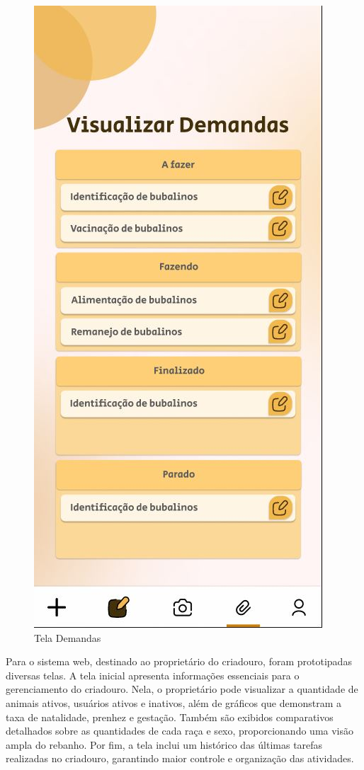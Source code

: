 \newpage
\begin{figure}[!h]
\centering
\caption{Tela Demandas}%
\label{fig:ux-mobile04}
\includegraphics[scale=0.6]{Illustrations/UX-Mobile/Mobi-04.JPG}
\end{figure}

Para o sistema web, destinado ao proprietário do criadouro, foram prototipadas diversas telas. A tela inicial  apresenta informações essenciais para o gerenciamento do criadouro. Nela, o proprietário pode visualizar a quantidade de animais ativos, usuários ativos e inativos, além de gráficos que demonstram a taxa de natalidade, prenhez e gestação. Também são exibidos comparativos detalhados sobre as quantidades de cada raça e sexo, proporcionando uma visão ampla do rebanho. Por fim, a tela inclui um histórico das últimas tarefas realizadas no criadouro, garantindo maior controle e organização das atividades.

